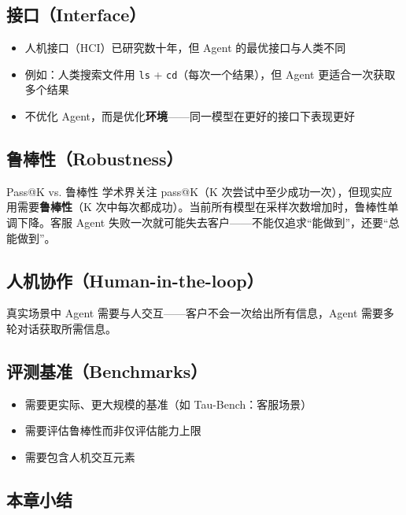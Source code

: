 \documentclass[a4paper]{article}
\begin{document}
\subsection{接口（Interface）}

\begin{itemize}
    \item 人机接口（HCI）已研究数十年，但 Agent 的最优接口与人类不同
    \item 例如：人类搜索文件用 \texttt{ls} + \texttt{cd}（每次一个结果），但 Agent 更适合一次获取多个结果
    \item 不优化 Agent，而是优化\textbf{环境}——同一模型在更好的接口下表现更好
\end{itemize}

\subsection{鲁棒性（Robustness）}

\begin{warningbox}{Pass@K vs. 鲁棒性}
学术界关注 pass@K（K 次尝试中至少成功一次），但现实应用需要\textbf{鲁棒性}（K 次中每次都成功）。当前所有模型在采样次数增加时，鲁棒性单调下降。客服 Agent 失败一次就可能失去客户——不能仅追求``能做到''，还要``总能做到''。
\end{warningbox}

\subsection{人机协作（Human-in-the-loop）}

真实场景中 Agent 需要与人交互——客户不会一次给出所有信息，Agent 需要多轮对话获取所需信息。

\subsection{评测基准（Benchmarks）}

\begin{itemize}
    \item 需要更实际、更大规模的基准（如 Tau-Bench：客服场景）
    \item 需要评估鲁棒性而非仅评估能力上限
    \item 需要包含人机交互元素
\end{itemize}

\subsection{本章小结}
\end{document}
